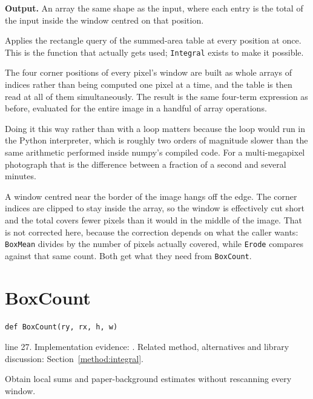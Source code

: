 \noindent\textbf{Output.} An array the same shape as the input, where each entry is the total of the input inside the window centred on that position.


Applies the rectangle query of the summed-area table at every position at once. This is the function that actually gets used; \texttt{Integral} exists to make it possible.


The four corner positions of every pixel's window are built as whole arrays of indices rather than being computed one pixel at a time, and the table is then read at all of them simultaneously. The result is the same four-term expression as before, evaluated for the entire image in a handful of array operations.

Doing it this way rather than with a loop matters because the loop would run in the Python interpreter, which is roughly two orders of magnitude slower than the same arithmetic performed inside numpy's compiled code. For a multi-megapixel photograph that is the difference between a fraction of a second and several minutes.


A window centred near the border of the image hangs off the edge. The corner indices are clipped to stay inside the array, so the window is effectively cut short and the total covers fewer pixels than it would in the middle of the image. That is not corrected here, because the correction depends on what the caller wants: \texttt{BoxMean} divides by the number of pixels actually covered, while \texttt{Erode} compares against that same count. Both get what they need from \texttt{BoxCount}.



\section{BoxCount}\label{fn:segment:BoxCount}
\begin{lstlisting}[style=sig]
def BoxCount(ry, rx, h, w)
\end{lstlisting}
 line 27. Implementation evidence: \cite{code2026}. Related method, alternatives and library discussion: Section~\ref{method:integral}.


Obtain local sums and paper-background estimates without rescanning every window.




